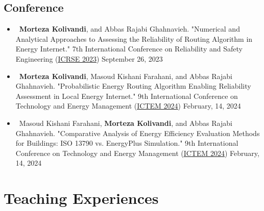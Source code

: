 \documentclass[letter,20pt]{article}
\begin{document}
\subsection*{Conference}
     \begin{itemize}[noitemsep, topsep=3pt, leftmargin=3ex]
    \small\item\ \textbf{Morteza Kolivandi}, and Abbas Rajabi Ghahnavieh. "Numerical and Analytical Approaches to Assessing the Reliability of Routing Algorithm in Energy Internet." 7th International Conference on Reliability and Safety Engineering (\href{https://www.icrse2023.ir/files_site/files/paper/icrse7-01450120.pdf}{\underline{ICRSE 2023}}\vspace{5pt}) September 26, 2023\vspace{5pt}
    \small\item\ \textbf{Morteza Kolivandi}, Masoud Kishani Farahani, and Abbas Rajabi Ghahnavieh. "Probabilistic Energy Routing Algorithm Enabling Reliability Assessment in Local Energy Internet."  9th International Conference on Technology and Energy Management (\href{https://www.icrse2023.ir/files_site/files/paper/icrse7-01450120.pdf}{\underline{ICTEM 2024}}\vspace{5pt}) February, 14, 2024\vspace{5pt}
    \small\item\ Masoud Kishani Farahani, \textbf{Morteza Kolivandi}, and Abbas Rajabi Ghahnavieh. "Comparative Analysis of Energy Efficiency Evaluation Methods for Buildings: ISO 13790 vs. EnergyPlus Simulation."  9th International Conference on Technology and Energy Management (\href{https://www.icrse2023.ir/files_site/files/paper/icrse7-01450120.pdf}{\underline{ICTEM 2024}}\vspace{5pt}) February, 14, 2024\vspace{5pt}
\end{itemize}

\section{Teaching Experiences}	    
\vspace{5pt}
\end{document}
